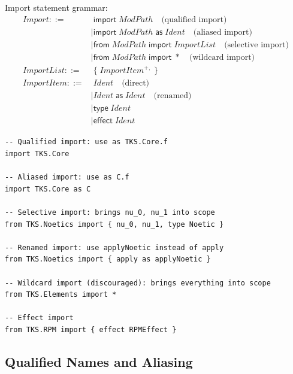 \begin{definition}
\label{def:import-syntax}
Import statement grammar:
\begin{align}
\mathit{Import} ::=&\; \mathsf{import}\; \mathit{ModPath} \quad \text{(qualified import)} \\
    &\mid \mathsf{import}\; \mathit{ModPath}\; \mathsf{as}\; \mathit{Ident} \quad \text{(aliased import)} \\
    &\mid \mathsf{from}\; \mathit{ModPath}\; \mathsf{import}\; \mathit{ImportList} \quad \text{(selective import)} \\
    &\mid \mathsf{from}\; \mathit{ModPath}\; \mathsf{import}\; * \quad \text{(wildcard import)} \\
\mathit{ImportList} ::=&\; \{\; \mathit{ImportItem}^{+,}\; \} \\
\mathit{ImportItem} ::=&\; \mathit{Ident} \quad \text{(direct)} \\
    &\mid \mathit{Ident}\; \mathsf{as}\; \mathit{Ident} \quad \text{(renamed)} \\
    &\mid \mathsf{type}\; \mathit{Ident} \\
    &\mid \mathsf{effect}\; \mathit{Ident}
\end{align}
\end{definition}

\begin{example}
\label{ex:import-variations}
\begin{verbatim}
-- Qualified import: use as TKS.Core.f
import TKS.Core

-- Aliased import: use as C.f
import TKS.Core as C

-- Selective import: brings nu_0, nu_1 into scope
from TKS.Noetics import { nu_0, nu_1, type Noetic }

-- Renamed import: use applyNoetic instead of apply
from TKS.Noetics import { apply as applyNoetic }

-- Wildcard import (discouraged): brings everything into scope
from TKS.Elements import *

-- Effect import
from TKS.RPM import { effect RPMEffect }
\end{verbatim}
\end{example}

\subsection{Qualified Names and Aliasing}
\label{subsec:qualified-names}

